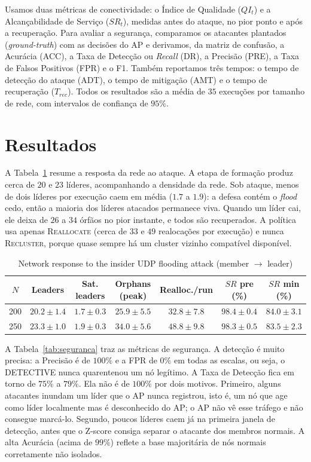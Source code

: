 \documentclass[conference]{IEEEtran}
\begin{document}
Usamos duas métricas de conectividade: o Índice de Qualidade ($QI_t$) e a
Alcançabilidade de Serviço ($SR_t$), medidas antes do ataque, no pior ponto e após
a recuperação. Para avaliar a segurança, comparamos os atacantes plantados
(\emph{ground-truth}) com as decisões do AP e derivamos, da matriz de confusão, a
Acurácia (ACC), a Taxa de Detecção ou \emph{Recall} (DR), a Precisão (PRE), a Taxa
de Falsos Positivos (FPR) e o F1. Também reportamos três tempos: o tempo de detecção
do ataque (ADT), o tempo de mitigação (AMT) e o tempo de recuperação ($T_{rec}$).
Todos os resultados são a média de $35$ execuções por tamanho de rede, com
intervalos de confiança de $95\%$.

\section{Resultados}

A Tabela~\ref{tab:rede} resume a resposta da rede ao ataque. A etapa de formação
produz cerca de $20$ e $23$ líderes, acompanhando a densidade da rede. Sob
ataque, menos de dois líderes por execução caem em média ($1.7$ a $1.9$): a defesa
contém o \emph{flood} cedo, então a maioria dos líderes atacados permanece viva.
Quando um líder cai, ele deixa de $26$ a $34$ órfãos no pior instante, e todos são
recuperados. A política usa apenas \textsc{Reallocate} (cerca de $33$ e $49$
realocações por execução) e nunca \textsc{Recluster}, porque quase sempre há um
cluster vizinho compatível disponível.

\begin{table}[t]
\centering
\caption{Network response to the insider UDP flooding attack (member $\to$ leader)}
\label{tab:rede}
\setlength{\tabcolsep}{9pt}
\renewcommand{\arraystretch}{1.2}
\begin{tabular}{ccccccc}
\hline
$N$ & Leaders & Sat. leaders & Orphans (peak) & Realloc./run & $SR$ pre (\%) & $SR$ min (\%) \\
\hline
200 & $20.2\pm1.4$ & $1.7\pm0.3$ & $25.9\pm5.5$ & $32.8\pm7.8$ & $98.4\pm0.4$ & $84.0\pm3.1$ \\
250 & $23.3\pm1.0$ & $1.9\pm0.3$ & $34.0\pm5.6$ & $48.8\pm9.8$ & $98.3\pm0.5$ & $83.5\pm2.3$ \\
\hline
\end{tabular}
\end{table}

A Tabela~\ref{tab:seguranca} traz as métricas de segurança. A detecção é muito
precisa: a Precisão é de $100\%$ e a FPR de $0\%$ em todas as escalas, ou seja, o
DETECTIVE nunca quarentenou um nó legítimo. A Taxa de Detecção fica em torno de
$75\%$ a $79\%$. Ela não é de $100\%$ por dois motivos. Primeiro, alguns atacantes
inundam um líder que o AP nunca registrou, isto é, um nó que age como líder
localmente mas é desconhecido do AP; o AP não vê esse tráfego e não consegue
marcá-lo. Segundo, poucos líderes caem já na primeira janela de detecção, antes que
o Z-score consiga separar o atacante dos membros normais. A alta Acurácia (acima de
$99\%$) reflete a base majoritária de nós normais corretamente não isolados.
\end{document}
